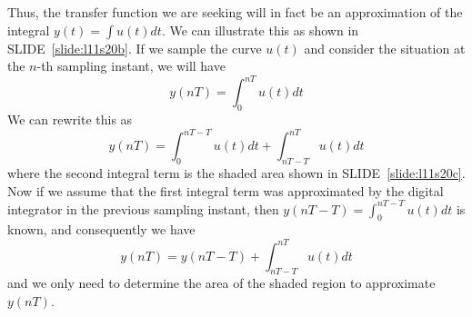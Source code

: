 Thus, the transfer function we are seeking will in fact be an approximation of the integral $y(t)=\int u(t) dt$. We can illustrate this as shown in SLIDE~\ref{slide:l11s20b}. If we sample the curve $u(t)$ and consider the situation at the $n$-th sampling instant, we will have $$y(nT) = \int_{0}^{nT} u(t) dt$$ We can rewrite this as $$y(nT)= \int_{0}^{nT-T} u(t) dt + \int_{nT-T}^{nT} u(t) dt$$ where the second integral term is the shaded area shown in SLIDE~\ref{slide:l11s20c}. Now if we assume that the first integral term was approximated by the digital integrator in the previous sampling instant, then $y(nT-T) = \int_{0}^{nT-T} u(t) dt$ is known, and consequently we have $$y(nT) = y(nT-T) + \int_{nT-T}^{nT} u(t) dt$$ and we only need to determine the area of the shaded region to approximate $y(nT)$.

\begin{slide}\label{slide:l11s20b}
\begin{center}
\end{center}
\end{slide}

\begin{slide}\label{slide:l11s20c}
\begin{center}
\end{center}
\end{slide}

